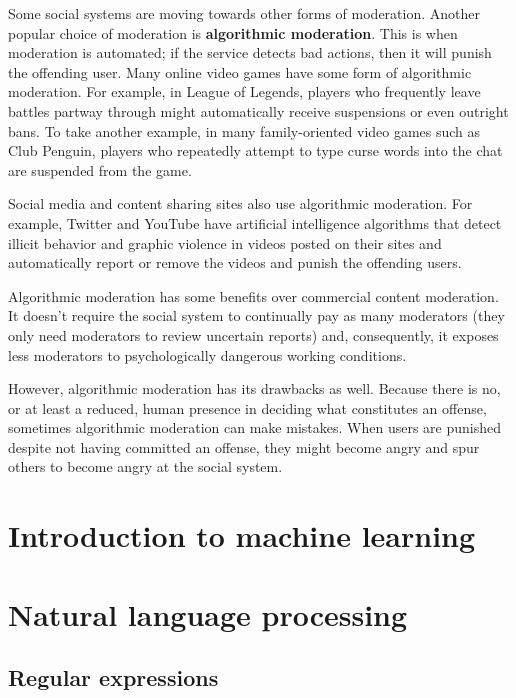 \documentclass[class=book, crop=false]{standalone}
\providecommand{\keyterm}[1]{\textbf{#1}\marginnote{\scriptsize \textbf{#1}}}
\begin{document}
Some social systems are moving towards other forms of moderation. Another popular choice of moderation is \keyterm{algorithmic moderation}. This is when moderation is automated; if the service detects bad actions, then it will punish the offending user. Many online video games have some form of algorithmic moderation. For example, in League of Legends, players who frequently leave battles partway through might automatically receive suspensions or even outright bans. To take another example, in many family-oriented video games such as Club Penguin, players who repeatedly attempt to type curse words into the chat are suspended from the game.

Social media and content sharing sites also use algorithmic moderation. For example, Twitter and YouTube have artificial intelligence algorithms that detect illicit behavior and graphic violence in videos posted on their sites and automatically report or remove the videos and punish the offending users.

Algorithmic moderation has some benefits over commercial content moderation. It doesn't require the social system to continually pay as many moderators (they only need moderators to review uncertain reports) and, consequently, it exposes less moderators to psychologically dangerous working conditions.

However, algorithmic moderation has its drawbacks as well. Because there is no, or at least a reduced, human presence in deciding what constitutes an offense, sometimes algorithmic moderation can make mistakes. When users are punished despite not having committed an offense, they might become angry and spur others to become angry at the social system.

\section{Introduction to machine learning}

\section{Natural language processing}

\subsection{Regular expressions}
\end{document}
